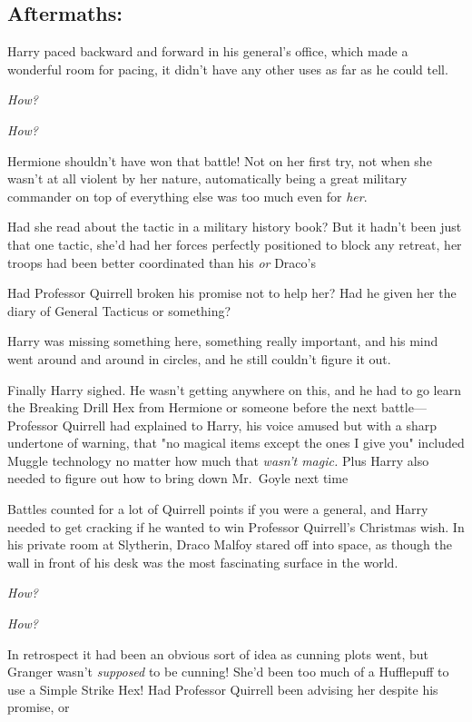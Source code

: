 
\subsection{Aftermaths:}

Harry paced backward and forward in his general's office, which made a
wonderful room for pacing, it didn't have any other uses as far as he could
tell.

\emph{How?}

\emph{How?}

Hermione shouldn't have won that battle! Not on her first try, not when she
wasn't at all violent by her nature, automatically being a great military
commander on top of everything else was too much even for \emph{her}.

Had she read about the tactic in a military history book? But it hadn't been
just that one tactic, she'd had her forces perfectly positioned to block any
retreat, her troops had been better coordinated than his \emph{or}
Draco's{\el}

Had Professor Quirrell broken his promise not to help her? Had he given her the
diary of General Tacticus or something?

Harry was missing something here, something really important, and his mind went
around and around in circles, and he still couldn't figure it out.

Finally Harry sighed. He wasn't getting anywhere on this, and he had to go
learn the Breaking Drill Hex from Hermione or someone before the next
battle—Professor Quirrell had explained to Harry, his voice amused but with a
sharp undertone of warning, that "no magical items except the ones I give you"
included Muggle technology no matter how much that \emph{wasn't magic.} Plus
Harry also needed to figure out how to bring down Mr.~Goyle next time{\el}

Battles counted for a lot of Quirrell points if you were a general, and Harry
needed to get cracking if he wanted to win Professor Quirrell's Christmas wish.
\sbreak
In his private room at Slytherin, Draco Malfoy stared off into space, as though
the wall in front of his desk was the most fascinating surface in the world.

\emph{How?}

\emph{How?}

In retrospect it had been an obvious sort of idea as cunning plots went, but
Granger wasn't \emph{supposed} to be cunning! She'd been too much of a
Hufflepuff to use a Simple Strike Hex! Had Professor Quirrell been advising her
despite his promise, or{\el}

